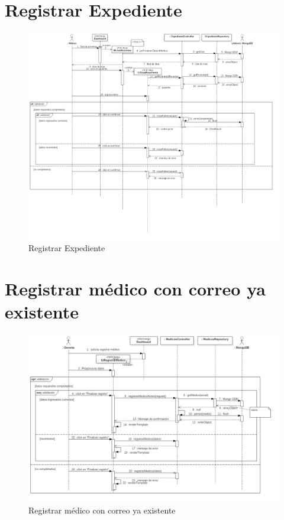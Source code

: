 \section{ Registrar Expediente}

\begin{figure}[htbp!]
	\centering
	\includegraphics[width=1\textwidth]{uml/DiagramasSecuencia/DavidPacheco/registrar-expediente}
	\caption{Registrar Expediente}
\end{figure}

\section{ Registrar médico con correo ya existente}

\begin{figure}[htbp!]
	\centering
	\includegraphics[width=1\textwidth]{uml/DiagramasSecuencia/DavidPacheco/registrar-medico}
	\caption{Registrar médico con correo ya existente}
\end{figure}

